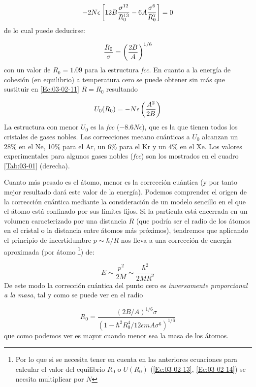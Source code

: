 \begin{equation}
	-2N\epsilon \left[  12 B \frac{\sigma^{12}}{R_0^{13}} - 6 A \frac{\sigma^6}{R_0^7} \right] = 0 \label{Ec:03-02-12}
\end{equation}	
de lo cual puede deducirse:

\begin{equation}
	\frac{R_0}{\sigma} =  \left( \frac{2B}{A} \right)^{1/6} \label{Ec:03-02-13}
\end{equation}
con un valor de $R_0=1.09$ para la estructura \textit{fcc}. En cuanto a la energía de cohesión (en equilibrio) a temperatura cero se puede obtener sin más que sustituir en \ref{Ec:03-02-11} $R=R_0$ resultando

\begin{equation}
	U_0 (R_0) = - N\epsilon \left( \frac{A^2}{2B} \right) \label{Ec:03-02-14}
\end{equation}
La estructura con menor $U_0$ es la \textit{fcc} ($-8.6 N\epsilon$), que es la que tienen todos los cristales de gases nobles. Las correcciones mecano cuánticas a $U_0$ alcanzan un 28\% en el Ne, 10\% para el Ar, un 6\% para el Kr y un  4\% en el Xe. Los valores experimentales para algunos gases nobles (\textit{fcc}) son los mostrados en el cuadro \ref{Tab:03-01} (derecha).

Cuanto más pesado es el átomo, menor es la corrección cuántica (y por tanto mejor resultado dará este valor de la energía). Podemos comprender el origen de la corrección cuántica mediante la consideración de un modelo sencillo en el que el átomo está confinado por sus límites fijos. Si la partícula está encerrada en un volumen caracterizado por una distancia $R$ (que podría ser el radio de los átomos en el cristal o la distancia entre átomos más próximos), tendremos que aplicando el principio de incertidumbre $p\sim \hbar /R$ nos lleva a una corrección de energía aproximada (por átomo \footnote{Por lo que si se necesita tener en cuenta en las anteriores ecuaciones para calcular el valor del equilibrio  $R_0$ o $U(R_0)$ (\ref{Ec:03-02-13}, \ref{Ec:03-02-14}) se necsita multiplicar por $N$}) de:

\begin{equation*}
	E \sim \frac{p^2}{2M} \sim \frac{\hbar^2}{2M R^2} 
\end{equation*} 
De este modo la corrección cuántica del punto cero es \textit{inversamente proporcional a la masa}, tal y como se puede ver en el radio

\begin{equation}
	R_0 = \frac{(2B/A)^{1/6} \sigma}{(1-\hbar^2 R_0^4 / 12\epsilon m A \sigma^6)^{1/6}}
\end{equation}
que como podemos ver es mayor cuando menor sea la masa de los átomos. \\

